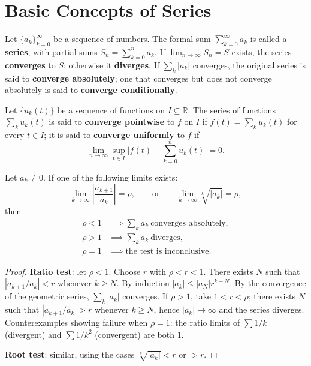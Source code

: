 \section{\texorpdfstring{Basic Concepts of Series}{Basic Concepts of Series}}

\begin{definition}\label{def:series_basic}
Let $\{a_k\}_{k=0}^{\infty}$ be a sequence of numbers. The formal sum $\sum_{k=0}^{\infty} a_k$ is called a \textbf{series}, with partial sums $S_n = \sum_{k=0}^{n} a_k$. If $\lim_{n\to\infty} S_n = S$ exists, the series \textbf{converges} to $S$; otherwise it \textbf{diverges}. If $\sum_k |a_k|$ converges, the original series is said to \textbf{converge absolutely}; one that converges but does not converge absolutely is said to \textbf{converge conditionally}.
\end{definition}

\begin{definition}\label{def:series_of_functions}
Let $\{u_k(t)\}$ be a sequence of functions on $I \subseteq \mathbb{R}$. The series of functions $\sum_k u_k(t)$ is said to \textbf{converge pointwise} to $f$ on $I$ if $f(t) = \sum_k u_k(t)$ for every $t \in I$; it is said to \textbf{converge uniformly} to $f$ if
\[
\lim_{n \to \infty} \sup_{t \in I} \Big| f(t) - \sum_{k=0}^{n} u_k(t) \Big| = 0.
\]
\end{definition}

\begin{proposition}\label{prop:ratio_root_tests}
Let $a_k \neq 0$. If one of the following limits exists:
\[
\lim_{k\to\infty} \left| \frac{a_{k+1}}{a_k} \right| = \rho,
\qquad\text{or}\qquad
\lim_{k\to\infty} \sqrt[k]{|a_k|} = \rho,
\]
then
\[
\begin{aligned}
\rho < 1 &\implies \sum_k a_k \ \text{converges absolutely}, \\
\rho > 1 &\implies \sum_k a_k \ \text{diverges}, \\
\rho = 1 &\implies \text{the test is inconclusive}.
\end{aligned}
\]
\end{proposition}

\begin{proof}
\textbf{Ratio test}: let $\rho < 1$. Choose $r$ with $\rho < r < 1$. There exists $N$ such that $|a_{k+1}/a_k| < r$ whenever $k \ge N$. By induction $|a_k| \le |a_N| r^{k-N}$. By the convergence of the geometric series, $\sum_k |a_k|$ converges. If $\rho > 1$, take $1 < r < \rho$; there exists $N$ such that $|a_{k+1}/a_k| > r$ whenever $k \ge N$, hence $|a_k| \to \infty$ and the series diverges. Counterexamples showing failure when $\rho = 1$: the ratio limits of $\sum 1/k$ (divergent) and $\sum 1/k^2$ (convergent) are both $1$.

\textbf{Root test}: similar, using the cases $\sqrt[k]{|a_k|} < r$ or $> r$.
\end{proof}


